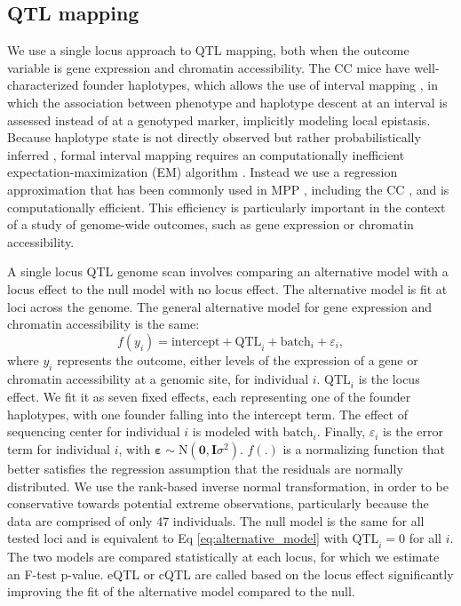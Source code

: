 \subsection{QTL mapping}

We use a single locus approach to QTL mapping, both when the outcome variable is gene expression and chromatin accessibility. The CC mice have well-characterized founder haplotypes, which allows the use of interval mapping \citep{Lander1989}, in which the association between phenotype and haplotype descent at an interval is assessed instead of at a genotyped marker, implicitly modeling local epistasis. Because haplotype state is not directly observed but rather probabilistically inferred \citep{Lander1987,Mott2000,Liu2010,Fu2012,Gatti2014,Zheng2015}, formal interval mapping requires an computationally inefficient expectation-maximization (EM) algorithm \citep{Dempster1977}. Instead we use a regression approximation \citep{Haley1992,Martinez1992} that has been commonly used in MPP \citep{Valdar2006a,Valdar2009,Svenson2012,Baud2013,Baud2014}, including the CC \citep{Aylor2011,Kelada2016,Mosedale2017,Donoghue2017}, and is computationally efficient. This efficiency is particularly important in the context of a study of genome-wide outcomes, such as gene expression or chromatin accessibility.

A single locus QTL genome scan involves comparing an alternative model with a locus effect to the null model with no locus effect. The alternative model is fit at loci across the genome. The general alternative model for gene expression and chromatin accessibility is the same: 
\begin{equation}
f(y_{i}) = \text{intercept} + \text{QTL}_{i} + \text{batch}_{i} + \varepsilon_{i},
\label{eq:alternative_model}
\end{equation}
where $y_{i}$ represents the outcome, either levels of the expression of a gene or chromatin accessibility at a genomic site, for individual $i$. $\text{QTL}_{i}$ is the locus effect. We fit it as seven fixed effects, each representing one of the founder haplotypes, with one founder falling into the intercept term. The effect of sequencing center for individual $i$ is modeled with $\text{batch}_{i}$. Finally, $\varepsilon_{i}$ is the error term for individual $i$, with $\boldsymbol{\varepsilon} \sim \text{N}(\mathbf{0}, \mathbf{I}\sigma^{2})$. $f(.)$ is a normalizing function that better satisfies the regression assumption that the residuals are normally distributed. We use the rank-based inverse normal transformation, in order to be conservative towards potential extreme observations, particularly because the data are comprised of only 47 individuals. The null model is the same for all tested loci and is equivalent to Eq \ref{eq:alternative_model} with $\text{QTL}_{i} = 0$ for all $i$. The two models are compared statistically at each locus, for which we estimate an F-test p-value. eQTL or cQTL are called based on the locus effect significantly improving the fit of the alternative model compared to the null. 

